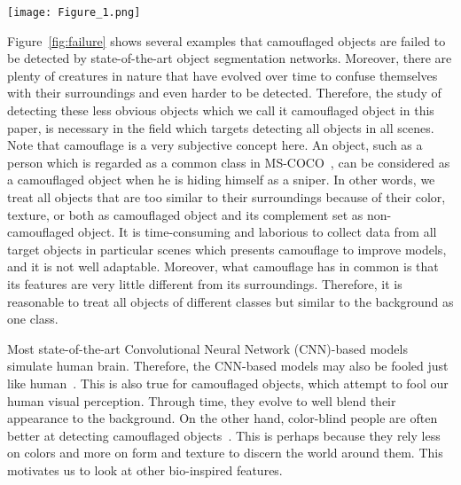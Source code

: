 \documentclass[journal]{IEEEtran}
\begin{document}
\begin{figure*}[!t]
	\centering
	\texttt{[image: Figure\_1.png]}
	\caption{Failure examples of the state-of-the-art method on camouflaged object segmentation. From top to bottom: the original images, the ground-truth maps, the camouflage maps of ANet-DHS~\cite{CAMO}, and ANet-SRM~\cite{CAMO}, and the instance segmentation results of Mask R-CNN~\cite{Kaiming-ICCV2017}. We remark that all these methods are fine-tuned on the camouflage dataset~\cite{CAMO}.
	} 
	\label{fig:failure}
\end{figure*}











Figure~\ref{fig:failure} shows several examples that camouflaged objects are failed to be detected by state-of-the-art object segmentation networks. Moreover, there are plenty of creatures in nature that have evolved over time to confuse themselves with their surroundings and even harder to be detected. Therefore, the study of detecting these less obvious objects which we call it camouflaged object in this paper, is necessary in the field which targets detecting all objects in all scenes. Note that camouflage is a very subjective concept here. An object, such as a person which is regarded as a common class in MS-COCO~\cite{Lin-ECCV2014}, can be considered as a camouflaged object when he is hiding himself as a sniper. In other words, we treat all objects that are too similar to their surroundings because of their color, texture, or both as camouflaged object and its complement set as non-camouflaged object. It is time-consuming and laborious to collect data from all target objects in particular scenes which presents camouflage to improve models, and it is not well adaptable. Moreover, what camouflage has in common is that its features are very little different from its surroundings. Therefore, it is reasonable to treat all objects of different classes but similar to the background as one class.

Most state-of-the-art Convolutional Neural Network (CNN)-based models~\cite{resnext, Szegedy-AAAI2017, Huang-CVPR2017} simulate human brain. Therefore, the CNN-based models may also be fooled just like human~\cite{Alcorn_2019_CVPR}. This is also true for camouflaged objects, which attempt to fool our human visual perception. Through time, they evolve to well blend their appearance to the background. On the other hand, color-blind people are often better at detecting camouflaged objects~\cite{colorblind}. This is perhaps because they rely less on colors and more on form and texture to discern the world around them. This motivates us to look at other bio-inspired features. 
\end{document}
